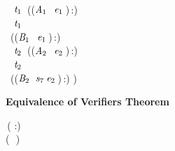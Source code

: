 \begin{holmath}
\,\\
\,\,\,\,\,\ensuremath{\HOLBoundVar{t}\sb{\mathrm{1}}}\,\,\HOLSymConst{=}\,((\ensuremath{\HOLBoundVar{A}\sb{\mathrm{1}}}\,\HOLSymConst{\HOLTokenProd{}}\,\,\HOLBoundVar{\ensuremath{\alpha}}\,\ensuremath{\HOLBoundVar{e}\sb{\mathrm{1}}}\,)\,:)\,\,\,\HOLSymConst{\HOLTokenConj{}}\\
\,\,\,\,\,\ensuremath{\HOLBoundVar{t}\sb{\mathrm{1}}}\,\,\HOLSymConst{=}\\
\,\,\,((\ensuremath{\HOLBoundVar{B}\sb{\mathrm{1}}}\,\HOLSymConst{\HOLTokenProd{}}\,\,\HOLBoundVar{\ensuremath{\beta}}\,\ensuremath{\HOLBoundVar{e}\sb{\mathrm{1}}}\,)\,:)\,\,\,\HOLSymConst{\HOLTokenConj{}}\\
\,\,\,\,\,\ensuremath{\HOLBoundVar{t}\sb{\mathrm{2}}}\,\,\HOLSymConst{=}\,((\ensuremath{\HOLBoundVar{A}\sb{\mathrm{2}}}\,\HOLSymConst{\HOLTokenProd{}}\,\,\HOLBoundVar{\ensuremath{\alpha}}\,\ensuremath{\HOLBoundVar{e}\sb{\mathrm{2}}}\,)\,:)\,\,\,\HOLSymConst{\HOLTokenConj{}}\\
\,\,\,\,\,\ensuremath{\HOLBoundVar{t}\sb{\mathrm{2}}}\,\,\HOLSymConst{=}\\
\,\,\,((\ensuremath{\HOLBoundVar{B}\sb{\mathrm{2}}}\,\HOLSymConst{\HOLTokenProd{}}\,\,\ensuremath{\HOLBoundVar{s}\sb{\mathrm{7}}}\,\ensuremath{\HOLBoundVar{e}\sb{\mathrm{2}}}\,)\,:)\,\,)
\end{holmath}   

\textbf{Equivalence of Verifiers Theorem}
\begin{holmath}
    \,( :)\,\HOLSymConst{\HOLTokenImp{}}\\
(\,\,\HOLSymConst{\HOLTokenEquiv{}}\,\,)
\end{holmath}  

